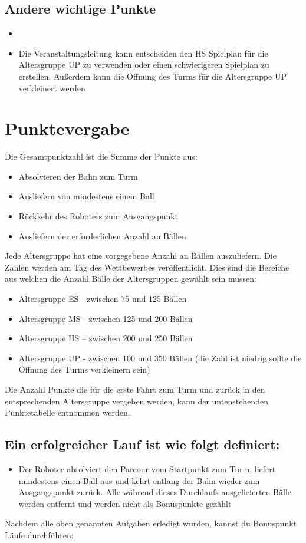 \documentclass[a4paper,12pt]{article}
\begin{document}
\subsection{Andere wichtige Punkte }
\begin{itemize}
	\item \lightConditions
	\item Die Veranstaltungsleitung kann entscheiden den HS Spielplan für
		die Altersgruppe UP zu verwenden oder einen schwierigeren
		Spielplan zu erstellen. Außerdem kann die Öffnung des Turms für
		die Altersgruppe UP verkleinert werden
\end{itemize}

\section{Punktevergabe}
Die Gesamtpunktzahl ist die Summe der Punkte aus:
\begin{itemize}
	\item Absolvieren der Bahn zum Turm
	\item Ausliefern von mindestens einem Ball
	\item Rückkehr des Roboters zum Ausgangspunkt
	\item Ausliefern der erforderlichen Anzahl an Bällen
\end{itemize}

Jede Altersgruppe hat eine vorgegebene Anzahl an Bällen auszuliefern. Die
Zahlen werden am Tag des Wettbewerbes veröffentlicht. Dies sind die Bereiche
aus welchen die Anzahl Bälle der Altersgruppen gewählt sein müssen:
\begin{itemize}
	\item Altersgruppe ES - zwischen 75 und 125 Bällen
	\item Altersgruppe MS - zwischen 125 und 200 Bällen
	\item Altersgruppe HS – zwischen 200 und 250 Bällen
	\item Altersgruppe UP - zwischen 100 und 350 Bällen (die Zahl ist
		niedrig sollte die Öffnung des Turms verkleinern sein)
\end{itemize}

Die Anzahl Punkte die für die erste Fahrt zum Turm und zurück in den
entsprechenden Altersgruppe vergeben werden, kann der untenstehenden
Punktetabelle entnommen werden.

\subsection{Ein erfolgreicher Lauf ist wie folgt definiert:}
\begin{itemize}
	\item Der Roboter absolviert den Parcour vom Startpunkt zum Turm,
		liefert mindestens einen Ball aus und kehrt entlang der Bahn
		wieder zum Ausgangspunkt zurück. Alle während dieses Durchlaufs
		ausgelieferten Bälle werden entfernt und werden nicht als
		Bonuspunkte gezählt
\end{itemize}
Nachdem alle oben genannten Aufgaben erledigt wurden, kannst du Bonuspunkt
Läufe durchführen:
\end{document}
